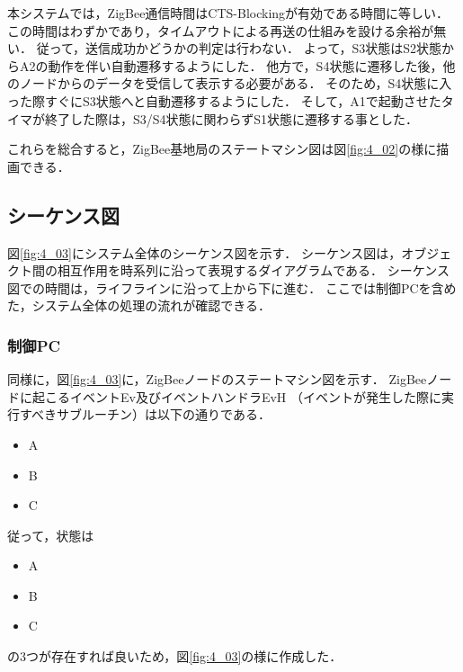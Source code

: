 \documentclass[12pt]{jreport}
\begin{document}
本システムでは，ZigBee通信時間はCTS-Blockingが有効である時間に等しい．
この時間はわずかであり，タイムアウトによる再送の仕組みを設ける余裕が無い．
従って，送信成功かどうかの判定は行わない．
よって，S3状態はS2状態からA2の動作を伴い自動遷移するようにした．
他方で，S4状態に遷移した後，他のノードからのデータを受信して表示する必要がある．
そのため，S4状態に入った際すぐにS3状態へと自動遷移するようにした．
そして，A1で起動させたタイマが終了した際は，S3/S4状態に関わらずS1状態に遷移する事とした．

これらを総合すると，ZigBee基地局のステートマシン図は図\ref{fig:4_02}の様に描画できる．

\subsection{シーケンス図}

図\ref{fig:4_03}にシステム全体のシーケンス図を示す．
シーケンス図は，オブジェクト間の相互作用を時系列に沿って表現するダイアグラムである．
シーケンス図での時間は，ライフラインに沿って上から下に進む．
ここでは制御PCを含めた，システム全体の処理の流れが確認できる．

\subsubsection{制御PC}

同様に，図\ref{fig:4_03}に，ZigBeeノードのステートマシン図を示す．
ZigBeeノードに起こるイベントEv及びイベントハンドラEvH
（イベントが発生した際に実行すべきサブルーチン）は以下の通りである．

\begin{itemize}
 \item A 
 \item B
 \item C
\end{itemize}

従って，状態は

\begin{itemize}
 \item A 
 \item B
 \item C
\end{itemize}

の3つが存在すれば良いため，図\ref{fig:4_03}の様に作成した．
\end{document}
